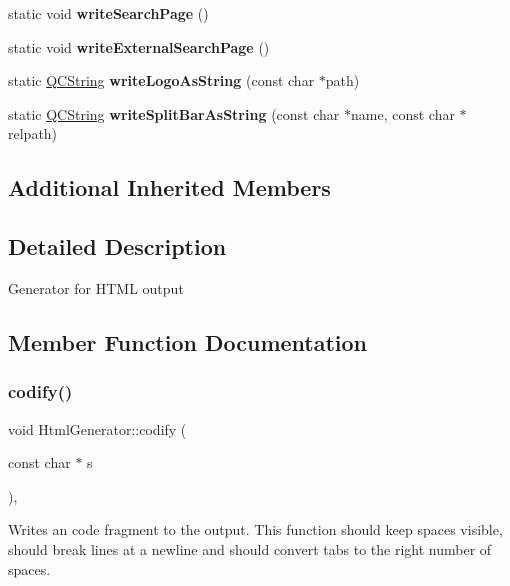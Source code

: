 \begin{DoxyCompactItemize}
static void {\bfseries write\+Search\+Page} ()
\item 
\mbox{\label{class_html_generator_a9588784ebebaad9cb24e153c07aeb662}} 
static void {\bfseries write\+External\+Search\+Page} ()
\item 
\mbox{\label{class_html_generator_a3d4f21a27792ff6872ade682475a5661}} 
static \mbox{\hyperlink{class_q_c_string}{Q\+C\+String}} {\bfseries write\+Logo\+As\+String} (const char $\ast$path)
\item 
\mbox{\label{class_html_generator_adfceb76ea8febf729a92331ffad0cf14}} 
static \mbox{\hyperlink{class_q_c_string}{Q\+C\+String}} {\bfseries write\+Split\+Bar\+As\+String} (const char $\ast$name, const char $\ast$relpath)
\end{DoxyCompactItemize}
\subsection*{Additional Inherited Members}


\subsection{Detailed Description}
Generator for H\+T\+ML output 

\subsection{Member Function Documentation}
\mbox{\label{class_html_generator_a574ab87e7aa9b92c11248027912851bc}} 
\subsubsection{\texorpdfstring{codify()}{codify()}}
{\footnotesize\ttfamily void Html\+Generator\+::codify (\begin{DoxyParamCaption}\item[{const char $\ast$}]{s }\end{DoxyParamCaption})\hspace{0.3cm}{\ttfamily [inline]}, {\ttfamily [virtual]}}

Writes an code fragment to the output. This function should keep spaces visible, should break lines at a newline and should convert tabs to the right number of spaces. 

